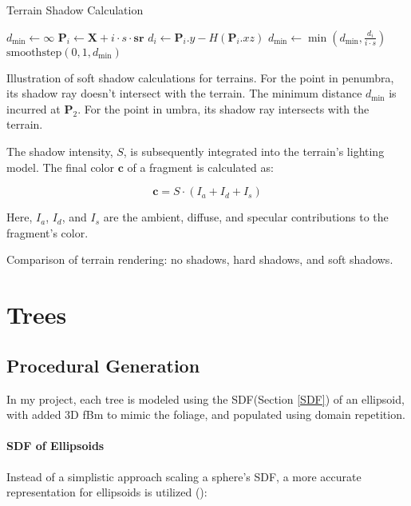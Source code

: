 \begin{algorithm}
\caption{Terrain Shadow Calculation}
\label{algo:soft shadow terrain}
\begin{algorithmic}
    \State $d_{\text{min}} \gets \infty$
        \State $\mathbf{P}_i \gets \mathbf{X} + i \cdot s \cdot \mathbf{sr}$
        \State $d_i \gets \mathbf{P}_i.y - H(\mathbf{P}_i.xz)$
        \State $d_{\text{min}} \gets \min(d_{\text{min}}, \frac{d_i}{i \cdot s})$
    \EndFor
    \State \Return $\text{smoothstep}(0, 1, d_{\text{min}})$
\EndFunction
\end{algorithmic}
\end{algorithm}

{Illustration of soft shadow calculations for terrains. For the point in penumbra, its shadow ray doesn't intersect with the terrain. The minimum distance $d_{\text{min}}$ is incurred at $\mathbf{P}_2$. For the point in umbra, its shadow ray intersects with the terrain.}

The shadow intensity, $S$, is subsequently integrated into the terrain's lighting model. The final color $\mathbf{c}$ of a fragment is calculated as:

\begin{equation}
    \mathbf{c} = S \cdot (I_{a} + I_{d} + I_{s})
\end{equation}

Here, $I_{a}$, $I_{d}$, and $I_{s}$ are the ambient, diffuse, and specular contributions to the fragment's color.

{Comparison of terrain rendering: no shadows, hard shadows, and soft shadows.}

\section{Trees}

\subsection{Procedural Generation}
\label{Tree Procedural Generation}

In my project, each tree is modeled using the SDF(Section \ref{SDF}) of an ellipsoid, with added 3D fBm to mimic the foliage, and populated using domain repetition. 

\paragraph{SDF of Ellipsoids}
Instead of a simplistic approach scaling a sphere's SDF, a more accurate representation for ellipsoids is utilized ():

